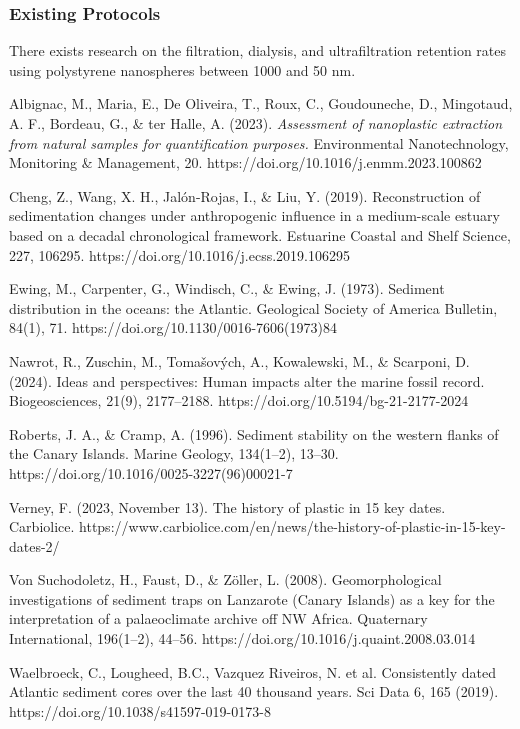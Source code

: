 \documentclass[twocolumn,a4paper,aps,amsmath,amssymb,floatfix,superscriptaddress]{revtex4-2}
\begin{document}
	\subsubsection{Existing Protocols}
	There exists research on the filtration, dialysis, and ultrafiltration retention rates using polystyrene nanospheres between 1000 and 50 nm.\cite{Assessment of nanoplastic extraction}
	
	\begin{thebibliography}{10}
		
		Albignac, M., Maria, E., De Oliveira, T., Roux, C., Goudouneche, D., Mingotaud, A. F., Bordeau, G., \& ter Halle, A. (2023). \textit{Assessment of nanoplastic extraction from natural samples for quantification purposes.} Environmental Nanotechnology, Monitoring \& Management, 20. https://doi.org/10.1016/j.enmm.2023.100862
		
		Cheng, Z., Wang, X. H., Jalón-Rojas, I., \& Liu, Y. (2019). Reconstruction of sedimentation changes under anthropogenic influence in a medium-scale estuary based on a decadal chronological framework. Estuarine Coastal and Shelf Science, 227, 106295. https://doi.org/10.1016/j.ecss.2019.106295
		
		 Ewing, M., Carpenter, G., Windisch, C., \& Ewing, J. (1973). Sediment distribution in the oceans: the Atlantic. Geological Society of America Bulletin, 84(1), 71. https://doi.org/10.1130/0016-7606(1973)84
		
		Nawrot, R., Zuschin, M., Tomašových, A., Kowalewski, M., \& Scarponi, D. (2024). Ideas and perspectives: Human impacts alter the marine fossil record. Biogeosciences, 21(9), 2177–2188. https://doi.org/10.5194/bg-21-2177-2024
		
		 Roberts, J. A., \& Cramp, A. (1996). Sediment stability on the western flanks of the Canary Islands. Marine Geology, 134(1–2), 13–30. https://doi.org/10.1016/0025-3227(96)00021-7
		
		 Verney, F. (2023, November 13). The history of plastic in 15 key dates. Carbiolice. https://www.carbiolice.com/en/news/the-history-of-plastic-in-15-key-dates-2/
		
		 Von Suchodoletz, H., Faust, D., \& Zöller, L. (2008). Geomorphological investigations of sediment traps on Lanzarote (Canary Islands) as a key for the interpretation of a palaeoclimate archive off NW Africa. Quaternary International, 196(1–2), 44–56. https://doi.org/10.1016/j.quaint.2008.03.014
		
		Waelbroeck, C., Lougheed, B.C., Vazquez Riveiros, N. et al. Consistently dated Atlantic sediment cores over the last 40 thousand years. Sci Data 6, 165 (2019). https://doi.org/10.1038/s41597-019-0173-8
		
	\end{thebibliography}
	
\end{document}
